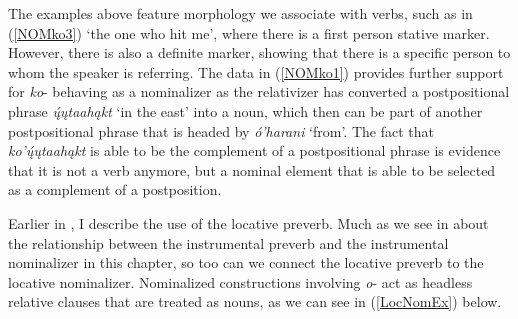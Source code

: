 The examples above feature morphology we associate with verbs, such as in (\ref{NOMko3}) `the one who hit me', where there is a first person stative marker. However, there is also a definite marker, showing that there is a specific person to whom the speaker is referring. The data in (\ref{NOMko1}) provides further support for \textit{ko}- behaving as a nominalizer as the relativizer has converted a postpositional phrase \textit{ų́ųtaahąkt} `in the east' into a noun, which then can be part of another postpositional phrase that is headed by \textit{ó'harani} `from'. The fact that \textit{ko'ų́ųtaahąkt} is able to be the complement of a postpositional phrase is evidence that it is not a verb anymore, but a nominal element that is able to be selected as a complement of a postposition.

\label{SubSubSubLocNom}

Earlier in , I describe the use of the locative preverb. Much as we see in  about the relationship between the instrumental preverb and the instrumental nominalizer in this chapter, so too can we connect the locative preverb to the locative nominalizer. Nominalized constructions involving \textit{o}- act as headless relative clauses that are treated as nouns, as we can see in (\ref{LocNomEx}) below.

